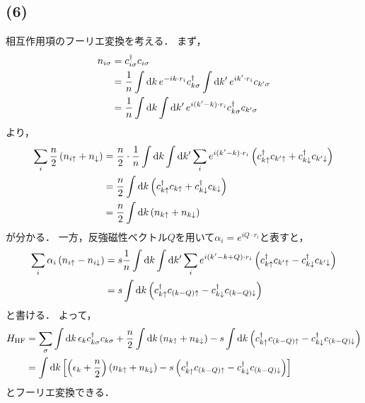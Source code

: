 \documentclass[a4paper,11pt]{jsarticle}
\begin{document}
\subsection*{(6)}
相互作用項のフーリエ変換を考える．
まず，
\begin{align}
  n_{i\sigma} &= c^{\dagger}_{i\sigma}c_{i\sigma} \notag\\
  &= \frac{1}{n} \int \dd{k} e^{-ik\cdot r_i} c^{\dagger}_{k\sigma} \int \dd{k'} e^{ik'\cdot r_i} c_{k'\sigma} \notag\\
  &= \frac{1}{n} \int \dd{k} \int \dd{k'} e^{i(k'-k)\cdot r_i} c^{\dagger}_{k\sigma}c_{k'\sigma}
\end{align}
より，
\begin{align}
  \sum_i \frac{n}{2}\left(n_{i\uparrow} + n_{\downarrow}\right) 
  &= \frac{n}{2}\cdot\frac{1}{n} \int \dd{k} \int \dd{k'} \sum_i e^{i(k'-k)\cdot r_i}  \left(c^{\dagger}_{k\uparrow}c_{k'\uparrow} + c^{\dagger}_{k\downarrow}c_{k'\downarrow} \right)\notag\\
  &= \frac{n}{2} \int \dd{k} \left(c^{\dagger}_{k\uparrow}c_{k\uparrow} + c^{\dagger}_{k\downarrow}c_{k\downarrow}\right) \notag\\
  &= \frac{n}{2} \int \dd{k} \left(n_{k\uparrow} + n_{k\downarrow}\right)
\end{align}
が分かる．
一方，反強磁性ベクトル$Q$を用いて$\alpha_i = e^{iQ\cdot r_i}$と表すと，
\begin{align}
  \sum_i \alpha_i \left(n_{i\uparrow} - n_{i\downarrow}\right)
  &= s \frac{1}{n} \int \dd{k} \int \dd{k'}\sum_i e^{i(k'-k+Q)\cdot r_i} \left(c^{\dagger}_{k\uparrow}c_{k'\uparrow} - c^{\dagger}_{k\downarrow}c_{k'\downarrow} \right) \notag \\
  &= s \int \dd{k} \left(c^{\dagger}_{k\uparrow}c_{(k-Q)\uparrow} - c^{\dagger}_{k\downarrow}c_{(k-Q)\downarrow} \right) 
\end{align}
と書ける．
よって，
\begin{align}
  H_{\mathrm{HF}} &= \sum_{\sigma}\int \dd{k} \epsilon_k c^{\dagger}_{k\sigma} c_{k\sigma} + \frac{n}{2} \int \dd{k} \left(n_{k\uparrow} + n_{k\downarrow}\right) - s \int \dd{k} \left(c^{\dagger}_{k\uparrow}c_{(k-Q)\uparrow} - c^{\dagger}_{k\downarrow}c_{(k-Q)\downarrow} \right) \notag\\
  &= \int \dd{k} \left[\left(\epsilon_k + \frac{n}{2}\right) \left(n_{k\uparrow}+n_{k\downarrow}\right) - s \left(c^{\dagger}_{k\uparrow}c_{(k-Q)\uparrow} - c^{\dagger}_{k\downarrow}c_{(k-Q)\downarrow} \right)\right]
\end{align}
とフーリエ変換できる．
\end{document}
